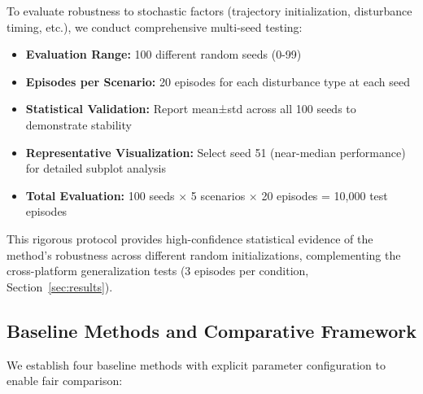 \documentclass[DTMColor]{ROB-New}
\begin{document}
To evaluate robustness to stochastic factors (trajectory initialization, disturbance timing, etc.), we conduct comprehensive multi-seed testing:
\begin{itemize}
    \item \textbf{Evaluation Range:} 100 different random seeds (0-99)
    \item \textbf{Episodes per Scenario:} 20 episodes for each disturbance type at each seed
    \item \textbf{Statistical Validation:} Report mean±std across all 100 seeds to demonstrate stability
    \item \textbf{Representative Visualization:} Select seed 51 (near-median performance) for detailed subplot analysis
    \item \textbf{Total Evaluation:} 100 seeds $\times$ 5 scenarios $\times$ 20 episodes = 10,000 test episodes
\end{itemize}

This rigorous protocol provides high-confidence statistical evidence of the method's robustness across different random initializations, complementing the cross-platform generalization tests (3 episodes per condition, Section~\ref{sec:results}).

\subsection{Baseline Methods and Comparative Framework}
\label{sec:baselines}

We establish four baseline methods with explicit parameter configuration to enable fair comparison:
\end{document}
